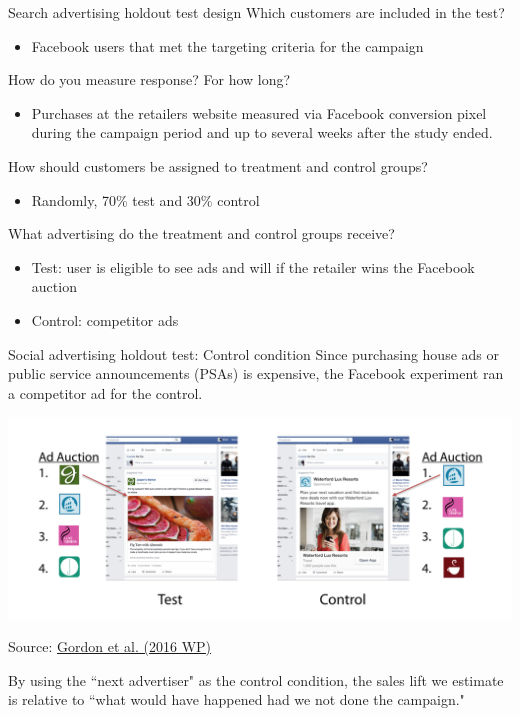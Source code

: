 \documentclass[10pt, aspectratio=169]{beamer}
\newcommand{\source}[1]{\begin{flushright} \footnotesize Source: {#1} \end{flushright} \normalsize}
\begin{document}
\begin{frame}{Search advertising holdout test design}
Which customers are included in the test?\\
\begin{itemize}
\item Facebook users that met the targeting criteria for the campaign
\end{itemize}
\pause 
How do you measure response? For how long?
\begin{itemize}
\item Purchases at the retailers website measured via Facebook conversion pixel during the campaign period and up to several weeks after the study ended.
\end{itemize}
\pause
How should customers be assigned to treatment and control groups? \\
\begin{itemize}
\item Randomly, 70\% test and 30\% control
\end{itemize}
\pause
What advertising do the treatment and control groups receive?\\
\begin{itemize}
\item Test: user is eligible to see ads and will if the retailer wins the Facebook auction
\item Control: competitor ads
\end{itemize}
\end{frame}

\begin{frame}{Social advertising holdout test: Control condition}
Since purchasing house ads or public service announcements (PSAs) is expensive, the Facebook experiment ran a competitor ad for the control. \\
\begin{center}
\includegraphics[height=0.5\textheight]{images/gordonetaltreatmentcontrol2.png}\\
\end{center}
\source{\href{https://github.com/eleafeit/ad_response_tutorial/blob/master/Papers/Gordonetal2016WPFieldExperimentsatFacebook.pdf}{Gordon et al. (2016 WP)}}
\alert{By using the ``next advertiser" as the control condition, the sales lift we estimate is relative to ``what would have happened had we not done the campaign."}
\end{frame}
\end{document}
